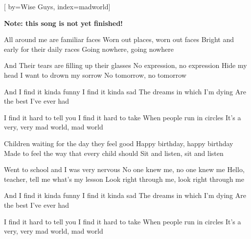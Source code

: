 

[%
    by={Wise Guys},
    index={madworld}]


    \label{madworld}

    \textbf{Note: this song is not yet finished!}

    \beginverse
        All around me are familiar faces
        Worn out places, worn out faces
        Bright and early for their daily races
        Going nowhere, going nowhere

        And Their tears are filling up their glasses
        No expression, no expression
        Hide my head I want to drown my sorrow
        No tomorrow, no tomorrow
    \endverse

    \beginchorus
        And I find it kinda funny
        I find it kinda sad
        The dreams in which I'm dying
        Are the best I've ever had

        I find it hard to tell you
        I find it hard to take
        When people run in circles
        It's a very, very mad world, mad world
    \endchorus

    \beginverse
        Children waiting for the day they feel good
        Happy birthday, happy birthday
        Made to feel the way that every child should
        Sit and listen, sit and listen

        Went to school and I was very nervous
        No one knew me, no one knew me
        Hello, teacher, tell me what's my lesson
        Look right through me, look right through me
    \endverse

    \beginchorus
        And I find it kinda funny
        I find it kinda sad
        The dreams in which I'm dying
        Are the best I've ever had

        I find it hard to tell you
        I find it hard to take
        When people run in circles
        It's a very, very mad world, mad world
    \endchorus
\endsong
